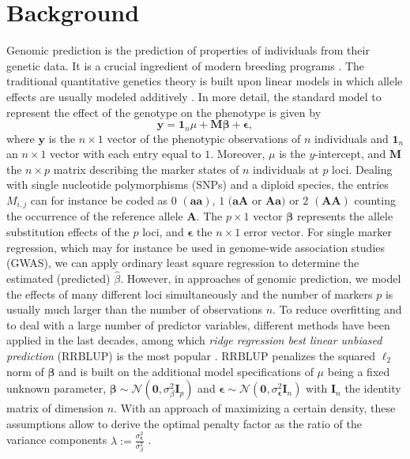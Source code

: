 \documentclass{bmcart}
\newcommand{\M}{\mathbf{M}}
\newcommand{\0}{\mathbf{0}}
\begin{document}
\section*{Background}
Genomic prediction is the prediction of properties of individuals from their genetic data. It is a crucial ingredient of modern breeding programs \cite{meuwissen01,schaeffer06,habier07,hayes09a,hayes13}.
The traditional quantitative genetics theory is built upon linear models in which allele effects are usually modeled additively \cite{falconer96}.
In more detail, the standard model to represent the effect of the genotype on the phenotype is given by
\begin{equation} \label{eq:01}
	\mathbf{y}=\mathbf{1}_n \mu + \M \bm{\beta} + \bm{\epsilon},
\end{equation} 
where $\mathbf{y}$ is the $n \times 1$ vector of the phenotypic observations of $n$ individuals and $\mathbf{1}_n$ an $n \times 1$ vector with each entry equal to $1$.  Moreover,
$\mu$ is the $y$-intercept, and $\M$  the  $n \times p$ matrix describing the marker states of $n$ individuals at $p$ loci. Dealing with single nucleotide polymorphisms (SNPs) and a diploid species, the entries $M_{i,j}$ can for instance be coded as $0$ $(\mathbf{aa})$, $1$ $(\mathbf{aA}$ or $\mathbf{Aa})$ or $2$ $(\mathbf{AA})$ counting the occurrence of the reference allele $\mathbf{A}$. The $p \times 1$ vector $\bm{\beta}$ represents the allele substitution effects of the $p$ loci, and $\bm{\epsilon}$ the $n \times 1$ error vector. For single marker regression, which may for instance be used in genome-wide association studies (GWAS), we can apply ordinary least square regression to determine the estimated (predicted) $\hat{\beta}$. 
However, in approaches of genomic prediction, we model the effects of many different loci simultaneously and the number of markers $p$ is usually much larger than the number of observations $n$. To reduce overfitting and to deal with a large number of predictor variables, different methods have been applied in the last decades, among which \emph{ridge regression best linear unbiased prediction} (RRBLUP) is the most popular \cite{schaeffer2004application}. RRBLUP penalizes the squared $\ell_2$ norm of $\bm{\beta}$ and is built on the additional model specifications of $\mu$ being a fixed unknown parameter, $\bm{\beta}\sim \mathcal{N}(\bm{0},\sigma_\beta^2 \mathbf{I}_p)$ and $\bm{\epsilon}\sim \mathcal{N}(\bm{0},\sigma_{\bm{\epsilon}}^2 \mathbf{I}_n)$ with $\mathbf{I}_n$ the identity matrix of dimension $n$.
With an approach of maximizing a certain density, these assumptions allow to derive the optimal penalty factor as the ratio of the variance components $\lambda:= \frac{\sigma_{\bm{\epsilon}}^2}{\sigma_\beta^2}$ \cite{henderson75,henderson76,henderson77}. %
\end{document}
